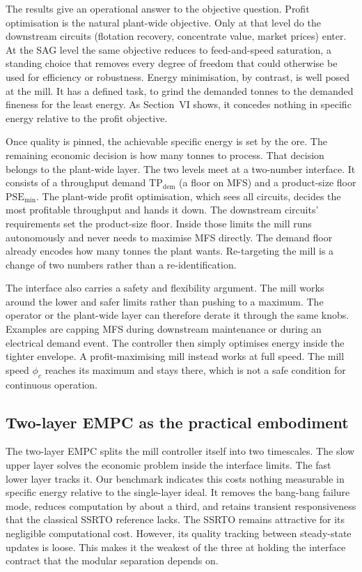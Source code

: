 \documentclass[conference]{IEEEtran}
\begin{document}
The results give an operational answer to the objective question. Profit
optimisation is the natural plant-wide objective. Only at that level do
the downstream circuits (flotation recovery, concentrate value, market
prices) enter. At the SAG level the same objective reduces to feed-and-speed
saturation, a standing choice that removes every degree of freedom that
could otherwise be used for efficiency or robustness. Energy
minimisation, by contrast, is well posed at the mill. It has a defined
task, to grind the demanded tonnes to the demanded fineness for the least
energy. As Section~VI shows, it concedes nothing in specific energy
relative to the profit objective.

Once quality is pinned, the achievable specific energy is set by the
ore. The remaining economic decision is how many tonnes to process.
That decision belongs to the plant-wide layer. The two levels meet at a
two-number interface. It consists of a
throughput demand $\mathrm{TP}_{\mathrm{dem}}$ (a floor on MFS) and a
product-size floor $\mathrm{PSE}_{\min}$. The plant-wide profit
optimisation, which sees all circuits, decides the most profitable
throughput and hands it down. The downstream circuits' requirements set
the product-size floor. Inside those limits the mill runs autonomously
and never needs to maximise MFS directly. The demand floor already
encodes how many tonnes the plant wants. Re-targeting the mill is a
change of two numbers rather than a re-identification.

The interface also carries a safety and flexibility argument. The mill
works around the lower and safer limits rather than pushing to a
maximum. The operator or the plant-wide layer can therefore derate it
through the same knobs. Examples are capping MFS during downstream
maintenance or during an electrical demand event.
The controller then simply optimises energy inside the tighter envelope.
A profit-maximising mill instead works at full speed. The mill speed
$\phi_c$ reaches its maximum and stays there, which is not a safe
condition for continuous operation.

\subsection{Two-layer EMPC as the practical embodiment}

The two-layer EMPC splits the mill controller itself into two
timescales. The slow upper layer solves the economic problem inside the
interface limits. The fast lower layer tracks it. Our benchmark indicates
this costs nothing measurable in specific energy relative to the
single-layer ideal. It removes the bang-bang failure mode, reduces
computation by about a third, and retains transient responsiveness that
the classical SSRTO reference lacks. The SSRTO remains attractive for its
negligible computational cost. However, its quality tracking between
steady-state updates is loose. This makes it the weakest of the three
at holding the interface contract that the modular separation depends
on.
\end{document}
